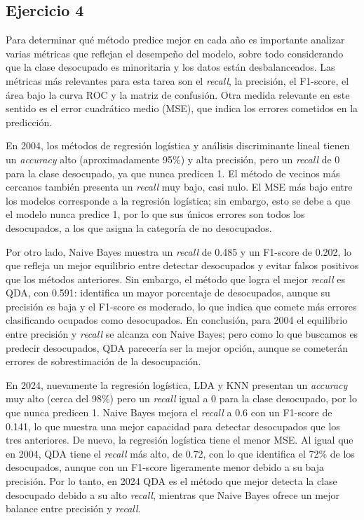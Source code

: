 \documentclass[11pt,a4paper]{article}
\begin{document}
\subsection*{Ejercicio 4}

Para determinar qué método predice mejor en cada año es importante analizar varias métricas
que reflejan el desempeño del modelo, sobre todo considerando que la clase desocupado es
minoritaria y los datos están desbalanceados. Las métricas más relevantes para esta tarea son
el \textit{recall}, la precisión, el F1-score, el área bajo la curva ROC y la matriz de
confusión. Otra medida relevante en este sentido es el error cuadrático medio (MSE), que
indica los errores cometidos en la predicción.

En 2004, los métodos de regresión logística y análisis discriminante lineal tienen un
\textit{accuracy} alto (aproximadamente 95\%) y alta precisión, pero un \textit{recall} de 0
para la clase desocupado, ya que nunca predicen 1. El método de vecinos más cercanos también
presenta un \textit{recall} muy bajo, casi nulo. El MSE más bajo entre los modelos corresponde
a la regresión logística; sin embargo, esto se debe a que el modelo nunca predice 1, por lo
que sus únicos errores son todos los desocupados, a los que asigna la categoría de no
desocupados.

Por otro lado, Naive Bayes muestra un \textit{recall} de 0.485 y un F1-score de 0.202, lo que
refleja un mejor equilibrio entre detectar desocupados y evitar falsos positivos que los
métodos anteriores. Sin embargo, el método que logra el mejor \textit{recall} es QDA, con
0.591: identifica un mayor porcentaje de desocupados, aunque su precisión es baja y el
F1-score es moderado, lo que indica que comete más errores clasificando ocupados como
desocupados. En conclusión, para 2004 el equilibrio entre precisión y \textit{recall} se
alcanza con Naive Bayes; pero como lo que buscamos es predecir desocupados, QDA parecería ser
la mejor opción, aunque se cometerán errores de sobrestimación de la desocupación.

En 2024, nuevamente la regresión logística, LDA y KNN presentan un \textit{accuracy} muy alto
(cerca del 98\%) pero un \textit{recall} igual a 0 para la clase desocupado, por lo que nunca
predicen 1. Naive Bayes mejora el \textit{recall} a 0.6 con un F1-score de 0.141, lo que
muestra una mejor capacidad para detectar desocupados que los tres anteriores. De nuevo, la
regresión logística tiene el menor MSE. Al igual que en 2004, QDA tiene el \textit{recall} más
alto, de 0.72, con lo que identifica el 72\% de los desocupados, aunque con un F1-score
ligeramente menor debido a su baja precisión. Por lo tanto, en 2024 QDA es el método que mejor
detecta la clase desocupado debido a su alto \textit{recall}, mientras que Naive Bayes ofrece
un mejor balance entre precisión y \textit{recall}.
\end{document}
